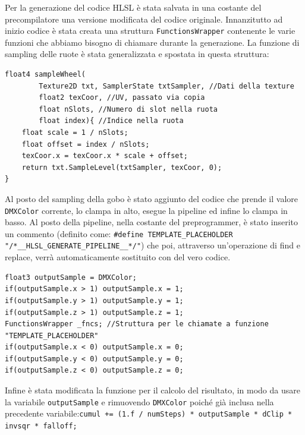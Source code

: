\documentclass[main.tex]{subfiles}
\begin{document}
Per la generazione del codice HLSL è stata salvata in una costante del precompilatore una versione modificata del codice originale. Innanzitutto ad inizio codice è stata creata una struttura \lstinline{FunctionsWrapper} contenente le varie funzioni che abbiamo bisogno di chiamare durante la generazione. La funzione di sampling delle ruote è stata generalizzata e spostata in questa struttura:
\lstset{language=glsl}
\begin{lstlisting}
float4 sampleWheel(
        Texture2D txt, SamplerState txtSampler, //Dati della texture
        float2 texCoor, //UV, passato via copia
        float nSlots, //Numero di slot nella ruota
        float index){ //Indice nella ruota
    float scale = 1 / nSlots;
    float offset = index / nSlots;
    texCoor.x = texCoor.x * scale + offset;
    return txt.SampleLevel(txtSampler, texCoor, 0);
}
\end{lstlisting}
Al posto del sampling della gobo è stato aggiunto del codice che prende il valore \lstinline{DMXColor} corrente, lo clampa in alto, esegue la pipeline ed infine lo clampa in basso. Al posto della pipeline, nella costante del preprogrammer, è stato inserito un commento (definito come: \lstinline{#define TEMPLATE_PLACEHOLDER "/*__HLSL_GENERATE_PIPELINE__*/"}) che poi, attraverso un'operazione di find e replace, verrà automaticamente sostituito con del vero codice.
\begin{lstlisting}
float3 outputSample = DMXColor;
if(outputSample.x > 1) outputSample.x = 1;
if(outputSample.y > 1) outputSample.y = 1;
if(outputSample.z > 1) outputSample.z = 1;
FunctionsWrapper _fncs; //Struttura per le chiamate a funzione
"TEMPLATE_PLACEHOLDER"
if(outputSample.x < 0) outputSample.x = 0;
if(outputSample.y < 0) outputSample.y = 0;
if(outputSample.z < 0) outputSample.z = 0;
\end{lstlisting}
Infine è stata modificata la funzione per il calcolo del risultato, in modo da usare la variabile \lstinline{outputSample} e rimuovendo \lstinline{DMXColor} poiché già inclusa nella precedente variabile:\newline \lstinline{cumul += (1.f / numSteps) * outputSample * dClip * invsqr * falloff;}\newline
\end{document}
